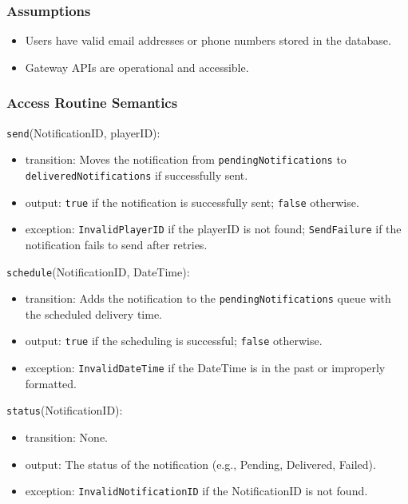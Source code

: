 \documentclass[12pt, titlepage]{article}
\begin{document}
\subsubsection{Assumptions}

\begin{itemize}
    \item Users have valid email addresses or phone numbers stored in the database.
    \item Gateway APIs are operational and accessible.
\end{itemize}

\subsubsection{Access Routine Semantics}

\noindent \texttt{send}(NotificationID, playerID):
\begin{itemize}
    \item transition: Moves the notification from \texttt{pendingNotifications} to \texttt{deliveredNotifications} if successfully sent.
    \item output: \texttt{true} if the notification is successfully sent; \texttt{false} otherwise.
    \item exception: \texttt{InvalidPlayerID} if the playerID is not found; \texttt{SendFailure} if the notification fails to send after retries.
\end{itemize}

\noindent \texttt{schedule}(NotificationID, DateTime):
\begin{itemize}
    \item transition: Adds the notification to the \texttt{pendingNotifications} queue with the scheduled delivery time.
    \item output: \texttt{true} if the scheduling is successful; \texttt{false} otherwise.
    \item exception: \texttt{InvalidDateTime} if the DateTime is in the past or improperly formatted.
\end{itemize}

\noindent \texttt{status}(NotificationID):
\begin{itemize}
    \item transition: None.
    \item output: The status of the notification (e.g., Pending, Delivered, Failed).
    \item exception: \texttt{InvalidNotificationID} if the NotificationID is not found.
\end{itemize}
\end{document}
